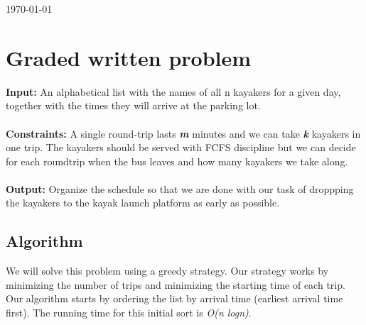 \documentclass[8pt]{article}
\begin{document}
\hfill \small{\today} \\
\setlength{\fboxrule}{.5mm}\setlength{\fboxsep}{1.2mm}
\newlength{\boxlength}\setlength{\boxlength}{\textwidth}
\addtolength{\boxlength}{-4mm}
\begin{center}\end{center}
\vspace{5mm}

\section{Graded written problem}

\textbf{Input:} An alphabetical list with the names of all n kayakers for a given day, together with the times they will arrive at the parking lot.
\\ \\
\textbf{Constraints:} A single round-trip lasts \textit{\textbf{m}} minutes and we can take \textit{\textbf{k}} kayakers in one trip. The kayakers should be served with FCFS discipline but we can decide for each roundtrip when the bus leaves and how many kayakers we take along.
\\ \\
\textbf{Output:} Organize the schedule so that we are done with our task of droppping the kayakers to the kayak launch platform as early as possible.

\subsection{Algorithm}
We will solve this problem using a greedy strategy. Our strategy works by minimizing the number of trips and minimizing the starting time of each trip. Our algorithm starts by ordering the list by arrival time (earliest arrival time first). The running time for this initial sort is \textit{O(n logn)}.
\end{document}
